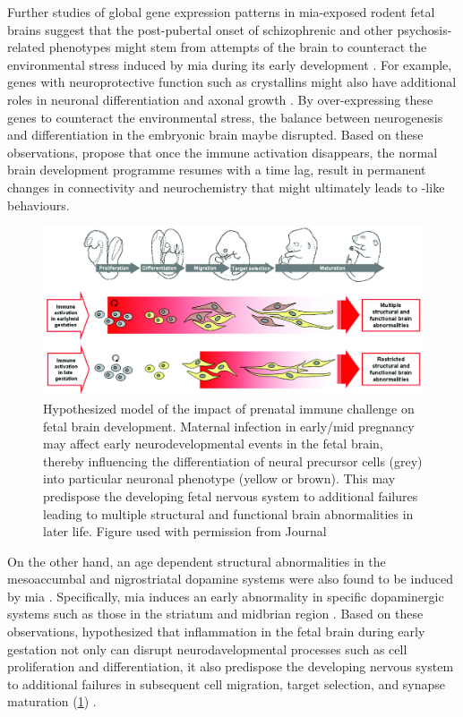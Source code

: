 \documentclass[12pt]{scrbook}
\newcommand*{\glng}{\glsentrylong}
\begin{document}
	Further studies of global gene expression patterns in \gls{mia}-exposed rodent fetal brains \citep{Oskvig2012,Garbett2012a} suggest that the post-pubertal onset of schizophrenic and other psychosis-related phenotypes might stem from attempts of the brain to counteract the environmental stress induced by \gls{mia} during its early development \citep{Garbett2012a}.
	For example, genes with neuroprotective function such as crystallins might also have additional roles in neuronal differentiation and axonal growth \citep{Garbett2012a}. 
	By over-expressing these genes to counteract the environmental stress, the balance between neurogenesis and differentiation in the embryonic brain maybe disrupted. 
	Based on these observations, \citet{Garbett2012a} propose that once the immune activation disappears, the normal brain development programme resumes with a time lag, result in permanent changes in connectivity and neurochemistry that might ultimately leads to \glng{scz}-like behaviours.
	\begin{figure}
		\centering
		\includegraphics[width=\textwidth]{figure/mia_impact.jpg}
		\caption[Hypothesized model of the impact of prenatal immune challenge on fetal brain development]{Hypothesized model of the impact of prenatal immune challenge on fetal brain development.
			Maternal infection in early/mid pregnancy may affect early neurodevelopmental events in the fetal brain, thereby influencing the differentiation of neural precursor cells (grey) into particular neuronal phenotype (yellow or brown).
			This may predispose the developing fetal nervous system to additional failures leading to multiple structural and functional brain abnormalities in later life.
			Figure used with permission from Journal \citep{Meyer2007a}}
		\label{fig:miaEffect}
	\end{figure}
	
	On the other hand, an age dependent structural abnormalities in the mesoaccumbal and nigrostriatal dopamine systems were also found to be induced by \gls{mia} \citep{Vuillermot2010}.
	Specifically, \gls{mia} induces an early abnormality in specific dopaminergic systems such as those in the striatum and midbrian region \citep{Vuillermot2010}.
	Based on these observations, \citet{Meyer2007a} hypothesized that inflammation in the fetal brain during early gestation not only can disrupt neurodavelopmental processes such as cell proliferation and differentiation, it also predispose the developing nervous system to additional failures in subsequent cell migration, target selection, and synapse maturation (\cref{fig:miaEffect}) \citep{Meyer2007a}.
	
\end{document}
